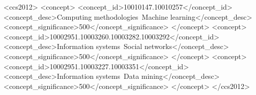 \documentclass[sigconf]{acmart}
\begin{document}
\begin{CCSXML}
<ccs2012>
<concept>
<concept_id>10010147.10010257</concept_id>
<concept_desc>Computing methodologies~Machine learning</concept_desc>
<concept_significance>500</concept_significance>
</concept>
<concept>
<concept_id>10002951.10003260.10003282.10003292</concept_id>
<concept_desc>Information systems~Social networks</concept_desc>
<concept_significance>500</concept_significance>
</concept>
<concept>
<concept_id>10002951.10003227.10003351</concept_id>
<concept_desc>Information systems~Data mining</concept_desc>
<concept_significance>500</concept_significance>
</concept>
</ccs2012>
\end{CCSXML}





\maketitle
\end{document}
